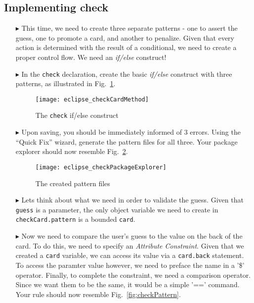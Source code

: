 \newpage
\subsection{Implementing check}
\texHeader
\hypertarget{checkCard tex}{}
 
\begin{itemize}
   
\item[$\blacktriangleright$] This time, we need to create three separate patterns - one to assert the guess, one to promote a card, and another to penalize.
Given that every action is determined with the result of a conditional, we need to create a proper control flow. We need an \emph{if/else} construct!

\item[$\blacktriangleright$] In the \texttt{check} declaration, create the basic \emph{if/else} construct with three patterns, as illustrated in
Fig.~\ref{fig:checkDec}.

\begin{figure}[htbp]
\begin{center}
  \texttt{[image: eclipse\_checkCardMethod]}
  \caption{The \texttt{check} if/else construct}
  \label{fig:checkDec}
\end{center}
\end{figure} 

\item[$\blacktriangleright$] Upon saving, you should be immediately informed of 3 errors. Using the ``Quick Fix'' wizard, generate the pattern files for all
three. Your package explorer should now resemble Fig.~\ref{fig:checkPatternsExplorer}.

\begin{figure}[htbp]
\begin{center}
  \texttt{[image: eclipse\_checkPackageExplorer]}
  \caption{The created pattern files}
  \label{fig:checkPatternsExplorer}
\end{center}
\end{figure} 

\item[$\blacktriangleright$] Lets think about what we need in order to validate the guess. Given that \texttt{guess} is a parameter, the only object variable
we need to create in \texttt{checkCard.pattern} is a bounded \texttt{card}.

\item[$\blacktriangleright$] Now we need to compare the user's guess to the value on the back of the card. To do this, we need to specify an \emph{Attribute
Constraint}. Given that we created a \texttt{card} variable, we can access its value via a \texttt{card.back} statement. To access the paramter
value however, we need to preface the name in a '\$' operator. Finally, to complete the constraint, we need a comparison operator. Since we want them
to be the same, it would be a simple '==' command. Your rule should now resemble Fig.~\ref{fig:checkPattern}.


\end{itemize}
